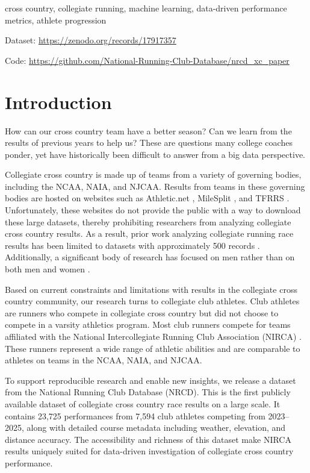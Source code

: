 \documentclass[suppldata]{interact}
\theoremstyle{plain}%
\theoremstyle{definition}
\theoremstyle{remark}
\begin{document}
\begin{keywords}
cross country, collegiate running, machine learning, data-driven performance metrics, athlete progression
\end{keywords}

Dataset: \url{https://zenodo.org/records/17917357}

Code: \url{https://github.com/National-Running-Club-Database/nrcd_xc_paper}
\newpage


\section{Introduction}

How can our cross country team have a better season? Can we learn from the results of previous years to help us? These are questions many college coaches ponder, yet have historically been difficult to answer from a big data perspective. 

Collegiate cross country is made up of teams from a variety of governing bodies, including the NCAA, NAIA, and NJCAA. Results from teams in these governing bodies are hosted on websites such as Athletic.net \cite{athleticnet}, MileSplit \cite{milesplit}, and TFRRS \cite{tfrrs}. Unfortunately, these websites do not provide the public with a way to download these large datasets, thereby prohibiting researchers from analyzing collegiate cross country results. As a result, prior work analyzing collegiate running race results has been limited to datasets with approximately 500 records \cite{millettpredicting}. Additionally, a significant body of research has focused on men rather than on both men and women \cite{james2023underrepresentation, smith2022auditing}.

Based on current constraints and limitations with results in the collegiate cross country community, our research turns to collegiate club athletes. Club athletes are runners who compete in collegiate cross country but did not choose to compete in a varsity athletics program. Most club runners compete for teams affiliated with the National Intercollegiate Running Club Association (NIRCA) \cite{nirca}.  These runners represent a wide range of athletic abilities and are comparable to athletes on teams in the NCAA, NAIA, and NJCAA. 

To support reproducible research and enable new insights, we release a dataset from the National Running Club Database (NRCD). This is the first publicly available dataset of collegiate cross country race results on a large scale. It contains 23,725 performances from 7,594 club athletes competing from 2023–2025, along with detailed course metadata including weather, elevation, and distance accuracy. The accessibility and richness of this dataset make NIRCA results uniquely suited for data-driven investigation of collegiate cross country performance.
\end{document}
